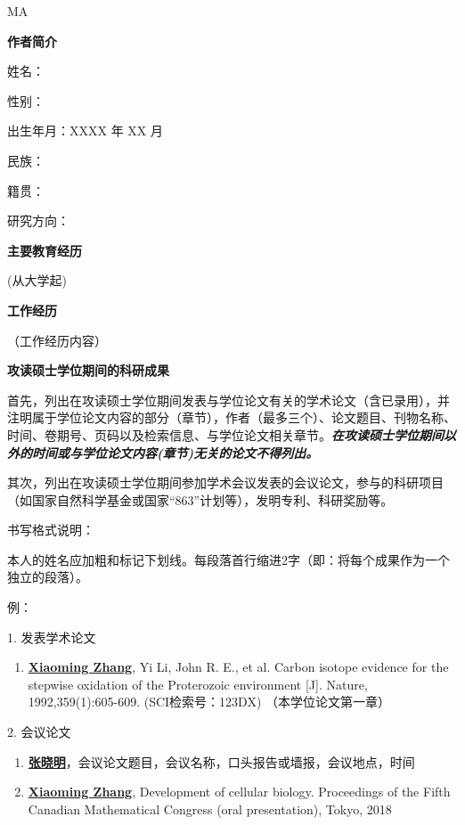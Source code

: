 
\begin{achievement}{MA}

{\bf 作者简介}

姓名：

性别：

出生年月：XXXX 年 XX 月

民族：

籍贯：

研究方向：

{\bf 主要教育经历}

(从大学起)

{\bf 工作经历}

（工作经历内容）

{\bf 攻读硕士学位期间的科研成果}

首先，列出在攻读硕士学位期间发表与学位论文有关的学术论文（含已录用），并注明属于学位论文内容的部分（章节），作者（最多三个）、论文题目、刊物名称、时间、卷期号、页码以及检索信息、与学位论文相关章节。{\bf\itshape 在攻读硕士学位期间以外的时间或与学位论文内容(章节)无关的论文不得列出。}

其次，列出在攻读硕士学位期间参加学术会议发表的会议论文，参与的科研项目（如国家自然科学基金或国家“863”计划等），发明专利、科研奖励等。

书写格式说明：

本人的姓名应加粗和标记下划线。每段落首行缩进2字（即：将每个成果作为一个独立的段落）。

例：

1. 发表学术论文
\begin{enumerate}[nosep, label=$\lbrack$\arabic*$\rbrack$]
  \item{\underline{\bf Xiaoming Zhang}, Yi Li, John R. E., et al. Carbon isotope evidence for the stepwise oxidation of the Proterozoic environment [J]. Nature, 1992,359(1):605-609. (SCI检索号：123DX) （本学位论文第一章）}
\end{enumerate}{}\vspace{1em}

2. 会议论文
\begin{enumerate}[nosep, label=$\lbrack$\arabic*$\rbrack$]
  \item{\underline{\bf 张晓明}，会议论文题目，会议名称，口头报告或墙报，会议地点，时间}
  \item{\underline{\bf Xiaoming Zhang}, Development of cellular biology. Proceedings of the Fifth Canadian Mathematical Congress (oral presentation), Tokyo, 2018}
\end{enumerate}{}\vspace{1em}


\end{achievement}
